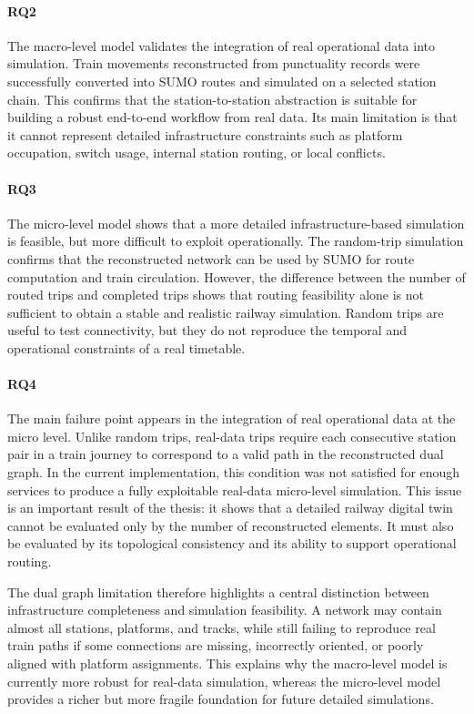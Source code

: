 \paragraph{\textbf{RQ2}} The macro-level model validates the integration of real operational data into simulation. Train 
movements reconstructed from punctuality records were successfully converted into SUMO routes and simulated on a selected 
station chain. This confirms that the station-to-station abstraction is suitable for building a robust end-to-end workflow 
from real data. Its main limitation is that it cannot represent detailed infrastructure constraints such as platform 
occupation, switch usage, internal station routing, or local conflicts.

\paragraph{\textbf{RQ3}} The micro-level model shows that a more detailed infrastructure-based simulation is feasible, but 
more difficult to exploit operationally. The random-trip simulation confirms that the reconstructed network can be used by 
SUMO for route computation and train circulation. However, the difference between the number of routed trips and completed 
trips shows that routing feasibility alone is not sufficient to obtain a stable and realistic railway simulation. Random 
trips are useful to test connectivity, but they do not reproduce the temporal and operational constraints of a real 
timetable.

\paragraph{\textbf{RQ4}} The main failure point appears in the integration of real operational data at the micro level. 
Unlike random trips, real-data trips require each consecutive station pair in a train journey to correspond to a valid path 
in the reconstructed dual graph. In the current implementation, this condition was not satisfied for enough services to 
produce a fully exploitable real-data micro-level simulation. This issue is an important result of the thesis: it shows 
that a detailed railway digital twin cannot be evaluated only by the number of reconstructed elements. It must also be 
evaluated by its topological consistency and its ability to support operational routing.

The dual graph limitation therefore highlights a central distinction between infrastructure completeness and simulation 
feasibility. A network may contain almost all stations, platforms, and tracks, while still failing to reproduce real train 
paths if some connections are missing, incorrectly oriented, or poorly aligned with platform assignments. This explains 
why the macro-level model is currently more robust for real-data simulation, whereas the micro-level model provides a 
richer but more fragile foundation for future detailed simulations.

